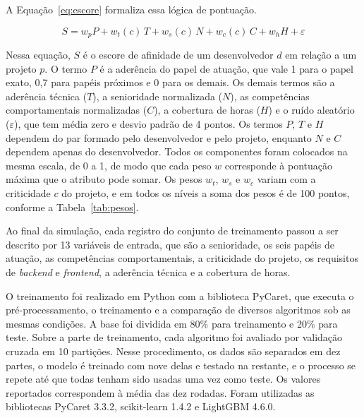 A Equação~\ref{eq:escore} formaliza essa lógica de pontuação.

\begin{equation}
S = w_p P + w_t(c)\, T + w_s(c)\, N + w_c(c)\, C + w_h H + \varepsilon
\label{eq:escore}
\end{equation}

Nessa equação, $S$ é o escore de afinidade de um desenvolvedor $d$ em relação a um projeto $p$. O termo $P$ é a aderência do papel de atuação, que vale 1 para o papel exato, 0,7 para papéis próximos e 0 para os demais. Os demais termos são a aderência técnica ($T$), a senioridade normalizada ($N$), as competências comportamentais normalizadas ($C$), a cobertura de horas ($H$) e o ruído aleatório ($\varepsilon$), que tem média zero e desvio padrão de 4 pontos. Os termos $P$, $T$ e $H$ dependem do par formado pelo desenvolvedor e pelo projeto, enquanto $N$ e $C$ dependem apenas do desenvolvedor. Todos os componentes foram colocados na mesma escala, de 0 a 1, de modo que cada peso $w$ corresponde à pontuação máxima que o atributo pode somar. Os pesos $w_t$, $w_s$ e $w_c$ variam com a criticidade $c$ do projeto, e em todos os níveis a soma dos pesos é de 100 pontos, conforme a Tabela~\ref{tab:pesos}.

\begin{table}[htbp]
\centering
\caption{Pesos de cada componente do escore de afinidade conforme a criticidade do projeto}
\label{tab:pesos}
\end{table}

Ao final da simulação, cada registro do conjunto de treinamento passou a ser descrito por 13 variáveis de entrada, que são a senioridade, os seis papéis de atuação, as competências comportamentais, a criticidade do projeto, os requisitos de \textit{backend} e \textit{frontend}, a aderência técnica e a cobertura de horas.

O treinamento foi realizado em Python com a biblioteca PyCaret, que executa o pré-processamento, o treinamento e a comparação de diversos algoritmos sob as mesmas condições. A base foi dividida em 80\% para treinamento e 20\% para teste. Sobre a parte de treinamento, cada algoritmo foi avaliado por validação cruzada em 10 partições. Nesse procedimento, os dados são separados em dez partes, o modelo é treinado com nove delas e testado na restante, e o processo se repete até que todas tenham sido usadas uma vez como teste. Os valores reportados correspondem à média das dez rodadas. Foram utilizadas as bibliotecas PyCaret 3.3.2, scikit-learn 1.4.2 e LightGBM 4.6.0.


